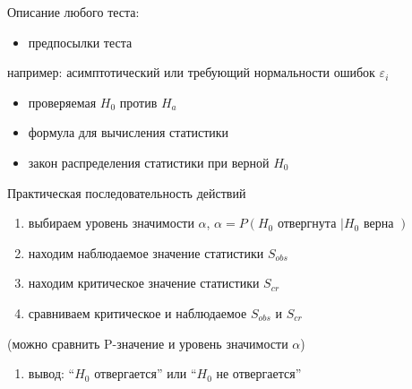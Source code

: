 \documentclass[ignorenonframetext,]{beamer}
\newcommand{\e}{\varepsilon}
\begin{document}
\begin{frame}{Описание любого теста:}

\begin{itemize}
\itemsep1pt\parskip0pt
\item
  предпосылки теста
\end{itemize}

например: асимптотический или требующий нормальности ошибок \(\e_i\)

\begin{itemize}
\itemsep1pt\parskip0pt
\item
  проверяемая \(H_0\) против \(H_a\)
\item
  формула для вычисления статистики
\item
  закон распределения статистики при верной \(H_0\)
\end{itemize}

\end{frame}

\begin{frame}{Практическая последовательность действий}

\begin{enumerate}
\def\labelenumi{\arabic{enumi}.}
\itemsep1pt\parskip0pt
\item
  выбираем уровень значимости \(\alpha\),
  \(\alpha=P(H_0 \text{ отвергнута }| H_0 \text{ верна })\)
\item
  находим наблюдаемое значение статистики \(S_{obs}\)
\item
  находим критическое значение статистики \(S_{cr}\)
\item
  сравниваем критическое и наблюдаемое \(S_{obs}\) и \(S_{cr}\)
\end{enumerate}

(можно сравнить P-значение и уровень значимости \(\alpha\))

\begin{enumerate}
\def\labelenumi{\arabic{enumi}.}
\setcounter{enumi}{4}
\itemsep1pt\parskip0pt
\item
  вывод: ``\(H_0\) отвергается'' или ``\(H_0\) не отвергается''
\end{enumerate}

\end{frame}
\end{document}
